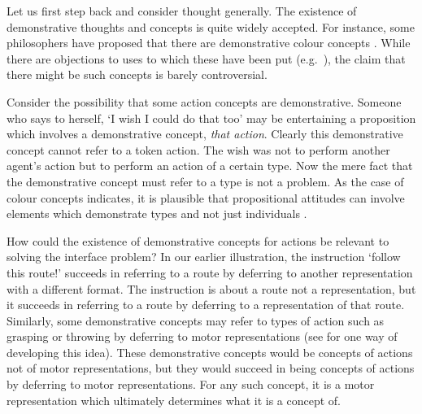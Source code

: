 \documentclass[12pt,\papersize]{extarticle}
\begin{document}
Let us first step back and consider thought generally. The existence of demonstrative thoughts and concepts is quite widely accepted. For instance, some philosophers have proposed that there are demonstrative colour concepts \citep{McDowell:1996yi,Brewer:1999ud}.  While there are objections to uses to which these have been put (e.g.\ \citealp{heck_jr._nonconceptual_2000,dokic_shades_2001}), the claim that there might be such concepts is barely controversial.

Consider the possibility that some action concepts are demonstrative. Someone who says to herself, `I wish I could do that too' may be entertaining a proposition which involves a demonstrative concept, \emph{that action}. Clearly this demonstrative concept cannot refer to a token action.  The wish was not to perform another agent's action but to perform an action of a certain type. Now the mere fact that the demonstrative concept must refer to a type is not a problem. As the case of colour concepts indicates, it is plausible that propositional attitudes can involve elements which demonstrate types and not just individuals \citep[see also][§3.4]{levine:2010_demonstrative}.

How could the existence of demonstrative concepts for actions be relevant  to solving the interface problem? In our earlier illustration, the instruction `follow this route!' succeeds in referring to a route by deferring to another representation with a different format. The instruction is about a route not a representation, but it succeeds in referring to a route by deferring to a representation of that route. Similarly, some demonstrative concepts may refer to types of action such as grasping or throwing by deferring to motor representations (see \citet{levine:2010_demonstrative} for one way of developing this idea). These demonstrative concepts would be concepts of actions not of motor representations, but they would succeed in being concepts of actions by deferring to motor representations. For any such concept, it is a motor representation which ultimately determines what it is a concept of.
\end{document}
